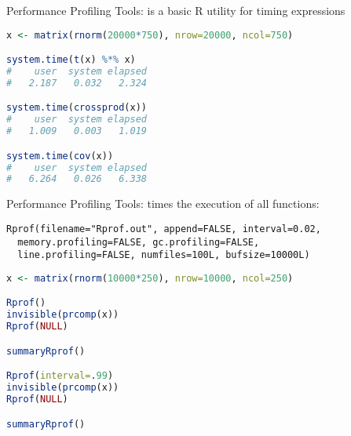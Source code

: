 \begin{frame}[fragile]
  \begin{block}{Performance Profiling Tools: }
   is a basic R utility for timing expressions
\begin{lstlisting}[language=R]
x <- matrix(rnorm(20000*750), nrow=20000, ncol=750)

system.time(t(x) %*% x)
#    user  system elapsed 
#   2.187   0.032   2.324

system.time(crossprod(x))
#    user  system elapsed 
#   1.009   0.003   1.019 

system.time(cov(x))
#    user  system elapsed 
#   6.264   0.026   6.338 
\end{lstlisting}
  \end{block}
\end{frame}



\begin{frame}[fragile]
\begin{block}{Performance Profiling Tools: }
 times the execution of all \R functions:
  \vspace{-.4cm}
\begin{lstlisting}[language=Rinteractive]
Rprof(filename="Rprof.out", append=FALSE, interval=0.02,
  memory.profiling=FALSE, gc.profiling=FALSE, 
  line.profiling=FALSE, numfiles=100L, bufsize=10000L)
\end{lstlisting}

\begin{lstlisting}[language=R]
x <- matrix(rnorm(10000*250), nrow=10000, ncol=250)

Rprof()
invisible(prcomp(x))
Rprof(NULL)

summaryRprof()

Rprof(interval=.99)
invisible(prcomp(x))
Rprof(NULL)

summaryRprof()
\end{lstlisting}
\end{block}
\end{frame}



